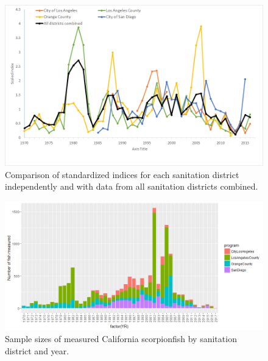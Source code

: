 \documentclass[12pt,]{article}
\begin{document}
\begin{figure}[htbp]
\centering
\includegraphics{Figures/Fleet7_Sanitation_indexcompare.png}
\caption{Comparison of standardized indices for each sanitation district
independently and with data from all sanitation districts combined.
\label{fig:Fleet7_Sanitation_indexcompare}}
\end{figure}

\begin{figure}[htbp]
\centering
\includegraphics{Figures/Fleet7_Sanitation_length_source.png}
\caption{Sample sizes of measured California scorpionfish by sanitation
district and year. \label{fig:Fleet7_Sanitation_lengthbydistrict}}
\end{figure}
\end{document}
